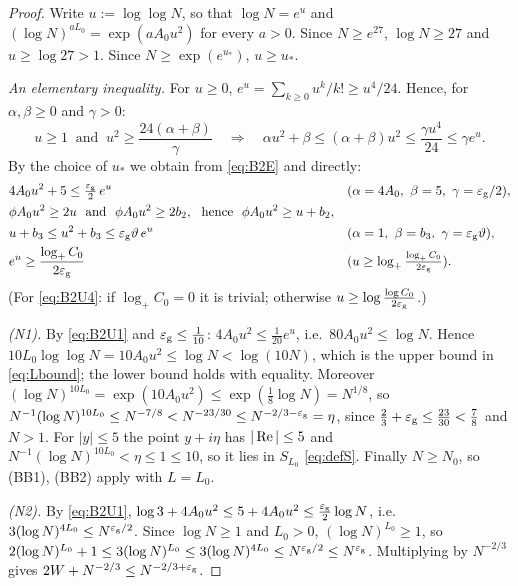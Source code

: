 \begin{proof}
Write $u:=\log\log N$, so that $\log N=e^u$ and $(\log N)^{aL_0}=\exp(aA_0u^2)$ for every $a>0$. Since $N\ge e^{27}$, $\log N\ge27$ and $u\ge\log27>1$.
Since $N\ge\exp(e^{u_*})$, $u\ge u_*$.

\emph{An elementary inequality.} For $u\ge0$, $e^u=\sum_{k\ge0}u^k/k!\ge u^4/24$. Hence, for $\alpha,\beta\ge0$ and $\gamma>0$:
\begin{equation}\tag{E}\label{eq:B2E}
u\ge1\ \text{ and }\ u^2\ge\frac{24(\alpha+\beta)}{\gamma}\quad\Longrightarrow\quad\alpha u^2+\beta\le(\alpha+\beta)u^2\le\frac{\gamma u^4}{24}\le\gamma e^u .
\end{equation}
By the choice of $u_*$ we obtain from \eqref{eq:B2E} and directly:
\begin{align}
&4A_0u^2+5\le\tfrac{\eg}2\,e^u\qquad&&(\alpha=4A_0,\ \beta=5,\ \gamma=\eg/2),\label{eq:B2U1}\\
&\phi A_0u^2\ge2u\ \text{ and }\ \phi A_0u^2\ge2b_2,\ \text{ hence }\ \phi A_0u^2\ge u+b_2,\label{eq:B2U2}\\
&u+b_3\le u^2+b_3\le\eg\vartheta\,e^u\qquad&&(\alpha=1,\ \beta=b_3,\ \gamma=\eg\vartheta),\label{eq:B2U3}\\
&e^u\ge\frac{\log_+C_0}{2\eg}\qquad&&(u\ge\log_+\tfrac{\log_+C_0}{2\eg}).\label{eq:B2U4}
\end{align}
(For \eqref{eq:B2U4}: if $\log_+C_0=0$ it is trivial; otherwise $u\ge\log\frac{\log C_0}{2\varepsilon_{\mathrm g}}$.)

\emph{\textup{(N1)}.} By \eqref{eq:B2U1} and $\varepsilon_{\mathrm g}\le\frac1{10}$: $4A_0u^2\le\frac1{20}e^u$, i.e.\ $80A_0u^2\le\log N$. Hence $10L_0\log\log N=10A_0u^2\le\log N<\log(10N)$,
which is the upper bound in \eqref{eq:Lbound}; the lower bound holds with equality. Moreover $(\log N)^{10L_0}=\exp(10A_0u^2)\le\exp(\frac18\log N)=N^{1/8}$, so
$N^{-1}(\log N)^{10L_0}\le N^{-7/8}<N^{-23/30}\le N^{-2/3-\varepsilon_{\mathrm g}}=\eta$, since $\frac23+\varepsilon_{\mathrm g}\le\frac{23}{30}<\frac78$ and $N>1$. For $|y|\le5$ the point $y+i\eta$
has $|\operatorname{Re}|\le5$ and $N^{-1}(\log N)^{10L_0}<\eta\le1\le10$, so it lies in $S_{L_0}$ \eqref{eq:defS}. Finally $N\ge N_0$, so (BB1), (BB2) apply with $L=L_0$.

\emph{\textup{(N2)}.} By \eqref{eq:B2U1}, $\log3+4A_0u^2\le5+4A_0u^2\le\frac{\varepsilon_{\mathrm g}}2\log N$, i.e.\ $3(\log N)^{4L_0}\le N^{\varepsilon_{\mathrm g}/2}$. Since $\log N\ge1$ and $L_0>0$,
$(\log N)^{L_0}\ge1$, so $2(\log N)^{L_0}+1\le3(\log N)^{L_0}\le3(\log N)^{4L_0}\le N^{\varepsilon_{\mathrm g}/2}\le N^{\varepsilon_{\mathrm g}}$. Multiplying by $N^{-2/3}$ gives $2W+N^{-2/3}\le N^{-2/3+\varepsilon_{\mathrm g}}$.


\end{proof}

